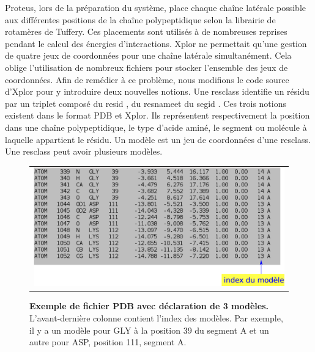 Proteus, lors de la préparation du système, place chaque chaîne latérale possible aux différentes positions de la chaîne polypeptidique selon la librairie de rotamères de Tuffery. Ces placements sont utilisés à de nombreuses reprises pendant le calcul des énergies d'interactions. Xplor ne permettait qu'une gestion de quatre jeux de coordonnées pour une chaîne latérale simultanément. Cela oblige l'utilisation de nombreux fichiers pour stocker l'ensemble des jeux de coordonnées. Afin de remédier à ce problème, nous modifions le code source d'Xplor pour y introduire deux nouvelles notions. Une \og resclass \fg identifie un résidu par un triplet composé du \og resid \fg, du \og resname\fg et du \og segid \fg. Ces trois notions existent dans le format PDB et Xplor. Ils représentent respectivement la position dans une chaîne polypeptidique, le type d'acide aminé, le segment ou molécule à laquelle appartient le résidu. Un \og modèle \fg est un jeu de coordonnées d'une resclass. Une resclass peut avoir plusieurs modèles.
   \begin{figure}[!htbp]
     \centering
     \begin{tabular}{c}
       \includegraphics[width=13cm]{figure/PDB.png} 
     \end{tabular}     
     \caption{\textbf{Exemple de fichier PDB avec déclaration de 3 modèles.} L'avant-dernière colonne contient l'index des modèles. Par exemple, il y a un modèle pour GLY à la position 39 du segment A et un autre pour ASP, position 111, segment A.}
\label{fig:PDB}
   \end{figure}
 
